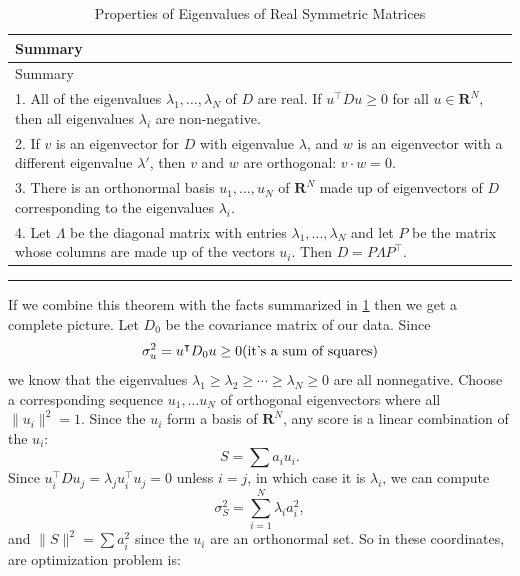 \documentclass[
]{article}
\begin{document}
\begin{longtable}[]{@{}l@{}}
\caption{Properties of Eigenvalues of Real Symmetric Matrices
\label{tbl:symmmat}}\tabularnewline
\toprule
\begin{minipage}[b]{0.97\columnwidth}\raggedright
Summary\strut
\end{minipage}\tabularnewline
\midrule
\endfirsthead
\toprule
\begin{minipage}[b]{0.97\columnwidth}\raggedright
Summary\strut
\end{minipage}\tabularnewline
\midrule
\endhead
\begin{minipage}[t]{0.97\columnwidth}\raggedright
1. All of the eigenvalues \(\lambda_{1},\ldots, \lambda_{N}\) of \(D\)
are real. If \(u^{\intercal}Du\ge 0\) for all \(u\in\mathbf{R}^{N}\),
then all eigenvalues \(\lambda_{i}\) are non-negative.\strut
\end{minipage}\tabularnewline
\begin{minipage}[t]{0.97\columnwidth}\raggedright
2. If \(v\) is an eigenvector for \(D\) with eigenvalue \(\lambda\), and
\(w\) is an eigenvector with a different eigenvalue \(\lambda'\), then
\(v\) and \(w\) are orthogonal: \(v\cdot w = 0\).\strut
\end{minipage}\tabularnewline
\begin{minipage}[t]{0.97\columnwidth}\raggedright
3. There is an orthonormal basis \(u_{1},\ldots, u_{N}\) of
\(\mathbf{R}^{N}\) made up of eigenvectors of \(D\) corresponding to the
eigenvalues \(\lambda_{i}\).\strut
\end{minipage}\tabularnewline
\begin{minipage}[t]{0.97\columnwidth}\raggedright
4. Let \(\Lambda\) be the diagonal matrix with entries
\(\lambda_{1},\ldots, \lambda_{N}\) and let \(P\) be the matrix whose
columns are made up of the vectors \(u_{i}\). Then
\(D = P\Lambda P^{\intercal}.\)\strut
\end{minipage}\tabularnewline
\bottomrule
\end{longtable}

\begin{center}\rule{0.5\linewidth}{0.5pt}\end{center}

If we combine this theorem with the facts summarized in
\cref{tbl:symmmat} then we get a complete picture. Let \(D_{0}\) be the
covariance matrix of our data. Since \[
\sigma_{u}^2 = u^{\intercal}D_{0}u\ge 0 \hbox{(it's a sum of squares)}
\] we know that the eigenvalues
\(\lambda_{1}\ge\lambda_{2}\ge \cdots \ge \lambda_{N}\ge 0\) are all
nonnegative. Choose a corresponding sequence \(u_{1},\ldots u_{N}\) of
orthogonal eigenvectors where all \(\|u_{i}\|^2=1\). Since the \(u_{i}\)
form a basis of \(\mathbf{R}^{N}\), any score is a linear combination of
the \(u_{i}\): \[
S = \sum a_{i}u_{i}.
\] Since
\(u_{i}^{\intercal}Du_{j} = \lambda_{j}u_{i}^{\intercal}u_{j} = 0\)
unless \(i=j\), in which case it is \(\lambda_{i}\), we can compute \[
\sigma_{S}^2 = \sum_{i=1}^{N} \lambda_{i}a_{i}^2,
\] and \(\|S\|^2=\sum a_{i}^2\) since the \(u_{i}\) are an orthonormal
set. So in these coordinates, are optimization problem is:
\end{document}
